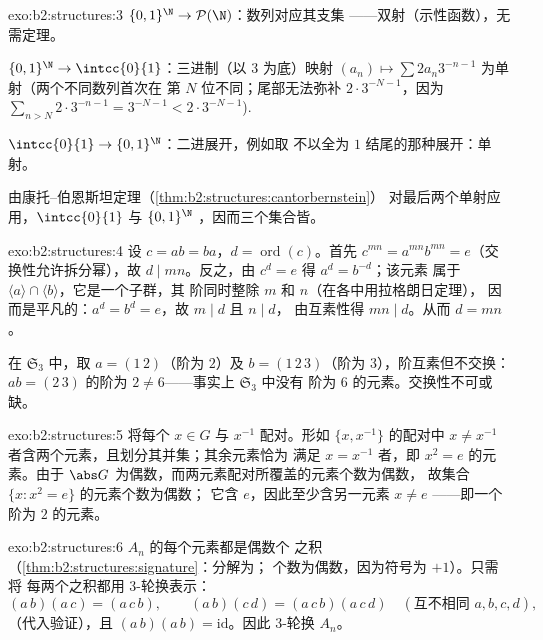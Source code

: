 \begin{solution}{exo:b2:structures:3}
$\{0,1\}^{\N} \to \mathcal{P}(\N)$：数列对应其支集
——双射（示性函数），无需定理。

$\{0,1\}^{\N} \to \intcc{0}{1}$：三进制（以 $3$ 为底）映射 $(a_n) \mapsto
\sum 2a_n 3^{-n-1}$ 为单射（两个不同数列首次在
第 $N$ 位不同；尾部无法弥补 $2\cdot
3^{-N-1}$，因为 $\sum_{n > N} 2\cdot 3^{-n-1} = 3^{-N-1} <
2\cdot3^{-N-1}$).

$\intcc{0}{1} \to \{0,1\}^{\N}$：二进展开，例如取
不以全为 $1$ 结尾的那种展开：单射。

由康托–伯恩斯坦定理（\cref{thm:b2:structures:cantorbernstein}）
对最后两个单射应用，$\intcc{0}{1}$ 与
$\{0,1\}^{\N}$ ，因而三个集合皆。
\end{solution}

\begin{solution}{exo:b2:structures:4}
设 $c = ab = ba$，$d = \operatorname{ord}(c)$。首先 $c^{mn} =
a^{mn} b^{mn} = e$（交换性允许拆分幂），故 $d
\mid mn$。反之，由 $c^d = e$ 得 $a^d = b^{-d}$；该元素
属于 $\langle a\rangle \cap \langle b\rangle$，它是一个子群，其
阶同时整除 $m$ 和 $n$（在各中用拉格朗日定理），
因而是平凡的：$a^d = b^d = e$，故 $m \mid d$ 且 $n \mid d$，
由互素性得 $mn \mid d$。从而 $d = mn$。

在 $\mathfrak{S}_3$ 中，取 $a = (1\,2)$（阶为 $2$）及 $b =
(1\,2\,3)$（阶为 $3$），阶互素但不交换：$ab =
(2\,3)$ 的阶为 $2 \neq 6$——事实上 $\mathfrak{S}_3$ 中没有
阶为 $6$ 的元素。交换性不可或缺。
\end{solution}

\begin{solution}{exo:b2:structures:5}
将每个 $x \in G$ 与 $x^{-1}$ 配对。形如 $\{x, x^{-1}\}$ 的配对中
$x \neq x^{-1}$ 者含两个元素，且划分其并集；其余元素恰为
满足 $x = x^{-1}$ 者，即 $x^2 =
e$ 的元素。由于 $\abs G$ 为偶数，而两元素配对所覆盖的元素个数为偶数，
故集合 $\{x : x^2 = e\}$ 的元素个数为偶数；
它含 $e$，因此至少含另一元素 $x \neq
e$ ——即一个阶为 $2$ 的元素。
\end{solution}

\begin{solution}{exo:b2:structures:6}
$A_n$ 的每个元素都是偶数个
之积（\cref{thm:b2:structures:signature}：分解为；
个数为偶数，因为符号为 $+1$）。只需将
每两个之积都用
$3$-轮换表示：
\[
(a\,b)(a\,c) = (a\,c\,b),
\qquad
(a\,b)(c\,d) = (a\,c\,b)(a\,c\,d) \quad (\text{互不相同 } a,b,c,d),
\]
（代入验证），且 $(a\,b)(a\,b) = \mathrm{id}$。因此
$3$-轮换 $A_n$。
\end{solution}

